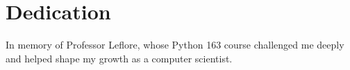 \chapter*{Dedication}

In memory of Professor Leflore, whose Python 163 course challenged me deeply and helped shape my growth as a computer scientist.
